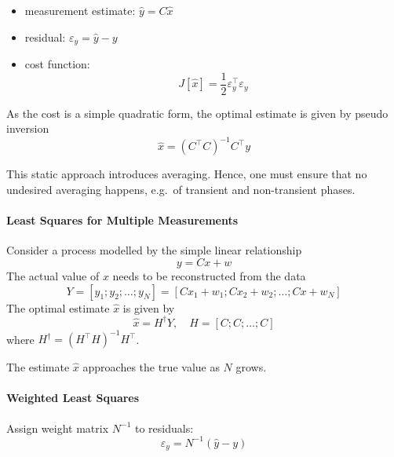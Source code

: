 \newpar{}
\begin{itemize}
    \item measurement estimate: $\hat{y} = C \hat{x}$
    \item residual: $\varepsilon_y = \hat{y} - y$
    \item cost function:
          \begin{equation*}
              J[\hat{x}] = \frac{1}{2} \varepsilon_y^\top \varepsilon_y
          \end{equation*}
\end{itemize}

\newpar{}

As the cost is a simple quadratic form, the optimal estimate is given by pseudo inversion
\begin{equation*}
    \hat{x} = {(C^\top C)}^{-1} C^\top y
\end{equation*}
\newpar{}

This static approach introduces averaging. Hence, one must ensure that no undesired averaging happens, e.g.\ of transient and non-transient phases.

\paragraph{Least Squares for Multiple Measurements}
Consider a process modelled by the simple linear relationship
\begin{equation*}
    y = Cx+w
\end{equation*}
The actual value of $x$ needs to be reconstructed from the data
\begin{equation*}
    Y = [y_1;y_2; \dots ;y_N] = [Cx_1+w_1; Cx_2+w_2; \dots ;Cx + w_N]
\end{equation*}
The optimal estimate $\hat{x}$ is given by
\begin{equation*}
    \hat{x} = H^{\dagger}Y, \quad H = [C;C; \dots ;C]
\end{equation*}
where $H^{\dagger} = {(H^\top H)}^{-1}H^\top$.

The estimate $\hat{x}$ approaches the true value as $N$ grows.

\paragraph{Weighted Least Squares}

Assign weight matrix $N^{-1}$ to residuals:
\begin{equation*}
    \varepsilon_y = N^{-1}(\hat{y} - y)
\end{equation*}

